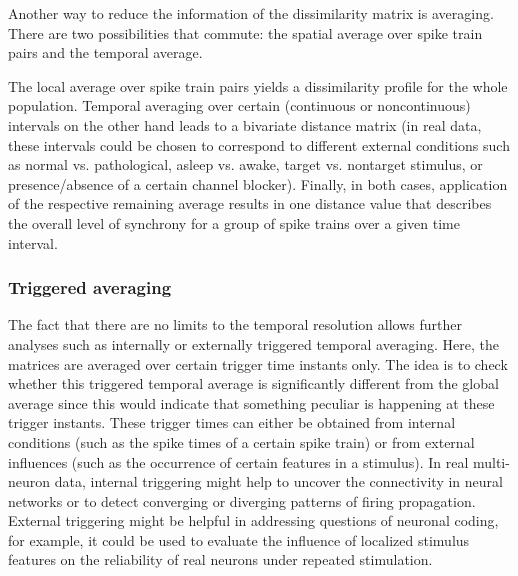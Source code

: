 \documentclass[10pt,twocolumn]{elsart5p}
\begin{document}
Another way to reduce the information of the dissimilarity matrix is averaging. There are two possibilities that commute: the spatial average over spike train pairs and the temporal average.

The local average over spike train pairs yields a dissimilarity profile for the whole population. Temporal averaging over certain (continuous or noncontinuous) intervals on the other hand leads to a bivariate distance matrix (in real data, these intervals could be chosen to correspond to different external conditions such as normal vs. pathological, asleep vs. awake, target vs. nontarget stimulus, or presence/absence of a certain channel blocker). Finally, in both cases, application of the respective remaining average results in one distance value that describes the overall level of synchrony for a group of spike trains over a given time interval.

\subsubsection{\label{sss:Triggered-Averaging} Triggered averaging}

The fact that there are no limits to the temporal resolution allows further analyses such as internally or externally triggered temporal averaging. Here, the matrices are averaged over certain trigger time instants only. The idea is to check whether this triggered temporal average is significantly different from the global average since this would indicate that something peculiar is happening at these trigger instants. These trigger times can either be obtained from internal conditions (such as the spike times of a certain spike train) or from external influences (such as the occurrence of certain features in a stimulus). In real multi-neuron data, internal triggering might help to uncover the connectivity in neural networks or to detect converging or diverging patterns of firing propagation. External triggering might be helpful in addressing questions of neuronal coding, for example, it could be used to evaluate the influence of localized stimulus features on the reliability of real neurons under repeated stimulation.
\end{document}
